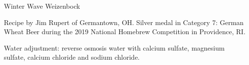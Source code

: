 \begin{recipe}{Winter Wave Weizenbock}

\begin{aboutblock}
Recipe by Jim Rupert of Germantown, OH. Silver medal in Category 7: German
Wheat Beer during the 2019 National Homebrew Competition in Providence, RI.
\sourceaha
\end{aboutblock}


\begin{methodandtiming}
 
\begin{mashsteps}
\end{mashsteps}

\begin{directions}
Water adjustment: reverse osmosis water with  calcium sulfate,
 magnesium sulfate,  calcium chloride and 
sodium chloride.
\end{directions}

\end{methodandtiming}

\recipebreak

\begin{ingredientsblock}

\begin{malts}
\end{malts}

\begin{hops}
\end{hops}


\end{ingredientsblock}

\end{recipe}

